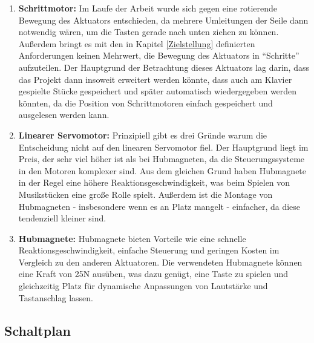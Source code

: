 \begin{enumerate}
	\item \textbf{Schrittmotor:} Im Laufe der Arbeit wurde sich gegen eine rotierende Bewegung des Aktuators entschieden, da mehrere Umleitungen der Seile dann notwendig wären, um die Tasten gerade nach unten ziehen zu können.
	Außerdem bringt es mit den in Kapitel \ref{Zielstellung} definierten Anforderungen keinen Mehrwert,
	die Bewegung des Aktuators in \enquote{Schritte} aufzuteilen. Der Hauptgrund der Betrachtung dieses Aktuators lag darin,
	dass das Projekt dann insoweit erweitert werden könnte, dass auch am Klavier
	gespielte Stücke gespeichert und später automatisch wiedergegeben werden könnten, da die Position von Schrittmotoren einfach gespeichert und ausgelesen werden kann.
	\item \textbf{Linearer Servomotor:} Prinzipiell gibt es drei Gründe warum die Entscheidung nicht auf den linearen Servomotor fiel.
	Der Hauptgrund liegt im Preis, der sehr viel höher ist als bei Hubmagneten, da die Steuerungssysteme in den Motoren komplexer sind.
	Aus dem gleichen Grund haben Hubmagnete in der Regel eine höhere Reaktionsgeschwindigkeit, was beim Spielen von Musikstücken eine große Rolle spielt.
	Außerdem ist die Montage von Hubmagneten - insbesondere wenn es an Platz mangelt - einfacher, da diese tendenziell kleiner sind.
	\item \textbf{Hubmagnete:} Hubmagnete bieten Vorteile wie eine schnelle Reaktionsgeschwindigkeit, einfache Steuerung und geringen Kosten im Vergleich zu den anderen Aktuatoren. Die verwendeten Hubmagnete können eine Kraft von 25N ausüben,
	was dazu genügt, eine Taste  zu spielen und gleichzeitig Platz für dynamische Anpassungen von Lautstärke und Tastanschlag lassen.
\end{enumerate}

\subsection{Schaltplan} \label{subsec:schaltplan}

